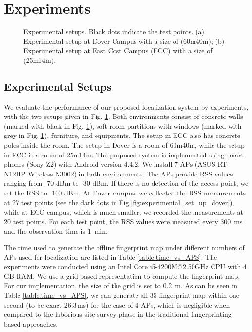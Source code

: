 \documentclass[10pt, conference, letterpaper]{IEEEtran}
\begin{document}
\vspace{-0.1in}
\section{Experiments}
\label{section:experimental_results}
\begin{figure}
  \centering
   \caption[Experimental setups]{Experimental setups. Black dots indicate the test points. 
(a) Experimental setup at Dover Campus with a size of (60m40m);
(b) Experimental setup at East Cost Campus (ECC) with a size of (25m14m).}
\label{fig:experimental_setups}
\vspace{-0.1in}
\end{figure}

\subsection{Experimental Setups}
We evaluate the performance of our proposed localization system by experiments, with the two setups given in Fig. \ref{fig:experimental_setups}. 
Both environments consist of concrete walls (marked with black in Fig. \ref{fig:experimental_setups}), 
soft room partitions with windows (marked with grey in Fig. \ref{fig:experimental_setups}), furniture, and equipments. 
The setup in ECC also has concrete poles inside the room. 
The setup in Dover is a room of 60m40m, while the setup in ECC is a room of 25m14m. 
The proposed system is implemented using smart phones (Sony Z2) with Android version 4.4.2.
We install 7 APs (ASUS RT-N12HP Wireless N3002) in both environments. 
The APs provide RSS values ranging from -70 dBm to -30 dBm. 
If there is no detection of the access point, we set the RSS to -100 dBm. 
At Dover campus, we collected the RSS measurements at 27 test points (see the dark dots in Fig.\ref{fig:experimental_set_up_dover}), 
while at ECC campus, which is much smaller, we recorded the measurements at 20 test points. 
For each test point, the RSS values were measured every 300~ms and the observation time is 1~min.

The time used to generate the offline fingerprint map under different numbers of APs used for localization are listed in Table \ref{table:time_vs_APS}. 
The experiments were conducted using an Intel Core i5-4200M@2.50GHz CPU with 4 GB RAM.
We use a grid-based representation to compute the fingerprint map. 
For our implementation, the size of the grid is set to 0.2~m. 
As can be seen in Table \ref{table:time_vs_APS},
we can generate all 35 fingerprint map within one second (to be exact 26.3\,ms) for the case of 4 APs, 
which is negligible when compared to the laborious site survey phase in the traditional fingerprinting-based approaches.
\end{document}
